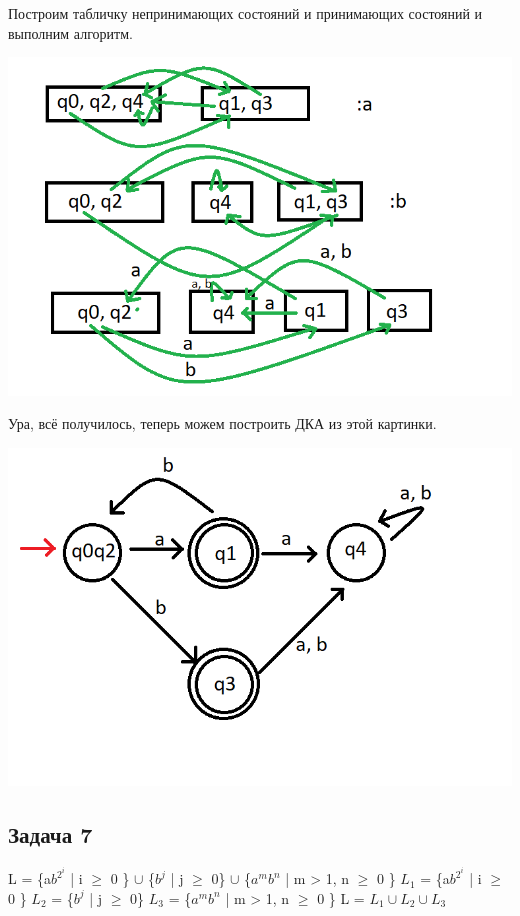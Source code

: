 \documentclass[a4paper,14pt]{article} %
\begin{document}
Построим табличку непринимающих состояний и принимающих состояний и выполним алгоритм.

\includegraphics[scale=0.7]{03.png}

Ура, всё получилось, теперь можем построить ДКА из этой картинки.

\includegraphics[scale=0.7]{04.png}

\subsection{Задача 7}
L = \{a$b^{2^i}$ | i $\geqslant$ 0 \} $\cup$ \{$b^j$ | j $\geqslant$ 0\} $\cup$ \{$a^mb^n$ | m > 1, n $\geqslant$ 0 \}
\newline
$L_1$ = \{a$b^{2^i}$ | i $\geqslant$ 0 \}
\newline
$L_2$ = \{$b^j$ | j $\geqslant$ 0\} 
\newline
$L_3$ = \{$a^mb^n$ | m > 1, n $\geqslant$ 0 \}
\newline
L = $L_1 \cup L_2 \cup L_3$
\end{document}
